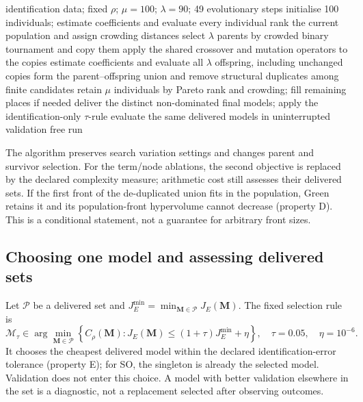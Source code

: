 \documentclass[11pt,a4paper]{article}
\theoremstyle{definition}
\theoremstyle{plain}
\theoremstyle{remark}
\newcommand{\M}{\mathbf{M}}
\begin{document}
\begin{algorithm}[!htbp]
\caption{Green MGGP with the common equal-evaluation protocol}
\label{alg:sharing}
\begin{algorithmic}[1]
\Require identification data; fixed $\rho$; $\mu=100$; $\lambda=90$; 49 evolutionary steps
\State initialise 100 individuals; estimate coefficients and evaluate every individual
\State rank the current population and assign crowding distances
\State select $\lambda$ parents by crowded binary tournament and copy them
\State apply the shared crossover and mutation operators to the copies
\State estimate coefficients and evaluate all $\lambda$ offspring, including unchanged copies
\State form the parent--offspring union and remove structural duplicates among finite candidates
\State retain $\mu$ individuals by Pareto rank and crowding; fill remaining places if needed
\EndFor
\State deliver the distinct non-dominated final models; apply the identification-only $\tau$-rule
\State evaluate the same delivered models in uninterrupted validation free run
\end{algorithmic}
\end{algorithm}
The algorithm preserves search variation settings and changes parent and survivor selection. For the term/node ablations, the second objective is replaced by the declared complexity measure; arithmetic cost still assesses their delivered sets. If the first front of the de-duplicated union fits in the population, Green retains it and its population-front hypervolume cannot decrease (property D). This is a conditional statement, not a guarantee for arbitrary front sizes.

\subsection{Choosing one model and assessing delivered sets}
Let $\mathcal P$ be a delivered set and $J_E^{\min}=\min_{\M\in\mathcal P}J_E(\M)$. The fixed selection rule is
\begin{equation}
\mathcal M_\tau\in\arg\min_{\M\in\mathcal P}\left\{C_\rho(\M):
J_E(\M)\le(1+\tau)J_E^{\min}+\eta\right\},
\quad\tau=0.05,\quad\eta=10^{-6}.
\label{eq:tau}
\end{equation}
It chooses the cheapest delivered model within the declared identification-error tolerance (property E); for SO, the singleton is already the selected model. Validation does not enter this choice. A model with better validation elsewhere in the set is a diagnostic, not a replacement selected after observing outcomes.
\end{document}
